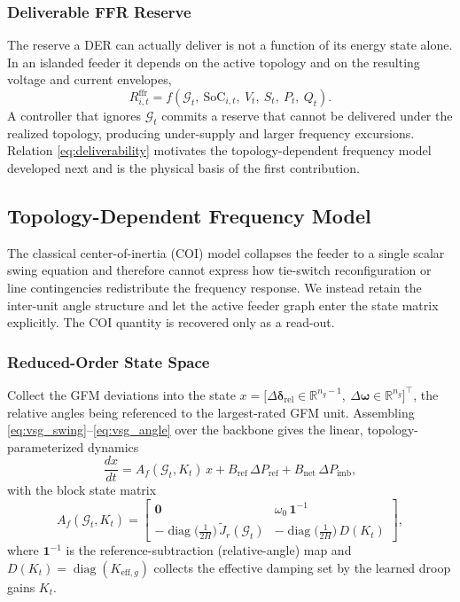 \documentclass[lettersize,journal]{IEEEtran}
\begin{document}
\subsubsection{Deliverable FFR Reserve}
The reserve a DER can actually deliver is not a function of its energy state alone. In an islanded feeder it depends on the active topology and on the resulting voltage and current envelopes,
\begin{equation}
  R^{\mathrm{ffr}}_{i,t}
   = f\!\left(\mathcal{G}_t,\ \mathrm{SoC}_{i,t},\ V_t,\ S_t,\ P_t,\ Q_t\right).
  \label{eq:deliverability}
\end{equation}
A controller that ignores $\mathcal{G}_t$ commits a reserve that cannot be delivered under the realized topology, producing under-supply and larger frequency excursions. Relation \eqref{eq:deliverability} motivates the topology-dependent frequency model developed next and is the physical basis of the first contribution.

\subsection{Topology-Dependent Frequency Model}
\label{sec:model:freqmodel}

The classical center-of-inertia (COI) model collapses the feeder to a single scalar swing equation and therefore cannot express how tie-switch
reconfiguration or line contingencies redistribute the frequency response. We instead retain the inter-unit angle structure and let the active feeder graph enter the state matrix explicitly. The COI quantity is recovered only as a read-out.

\subsubsection{Reduced-Order State Space}
Collect the GFM deviations into the state $x=\big[\Delta\boldsymbol{\delta}_{\mathrm{rel}}\in\mathbb{R}^{n_g-1},\
\Delta\boldsymbol{\omega}\in\mathbb{R}^{n_g}\big]^{\!\top}$, the relative angles being referenced to the largest-rated GFM unit. Assembling \eqref{eq:vsg_swing}--\eqref{eq:vsg_angle} over the backbone gives the linear, topology-parameterized dynamics
\begin{equation}
  \frac{dx}{dt}
   = A_f(\mathcal{G}_t,K_t)\,x
     + B_{\mathrm{ref}}\,\Delta P_{\mathrm{ref}}
     + B_{\mathrm{net}}\,\Delta P_{\mathrm{imb}},
  \label{eq:statespace}
\end{equation}
with the block state matrix
\begin{equation}
  A_f(\mathcal{G}_t,K_t)=
  \begin{bmatrix}
     \mathbf{0} & \omega_0\,\mathbf{1}^{-1}\\[4pt]
     -\operatorname{diag}\!\big(\tfrac{1}{2H}\big)\,\tilde{J}_r(\mathcal{G}_t)
        & -\operatorname{diag}\!\big(\tfrac{1}{2H}\big)\,D(K_t)
  \end{bmatrix},
  \label{eq:af_matrix}
\end{equation}
where $\mathbf{1}^{-1}$ is the reference-subtraction (relative-angle) map and $D(K_t)=\operatorname{diag}(K_{\mathrm{eff},g})$ collects the effective damping set by the learned droop gains $K_t$.
\end{document}
